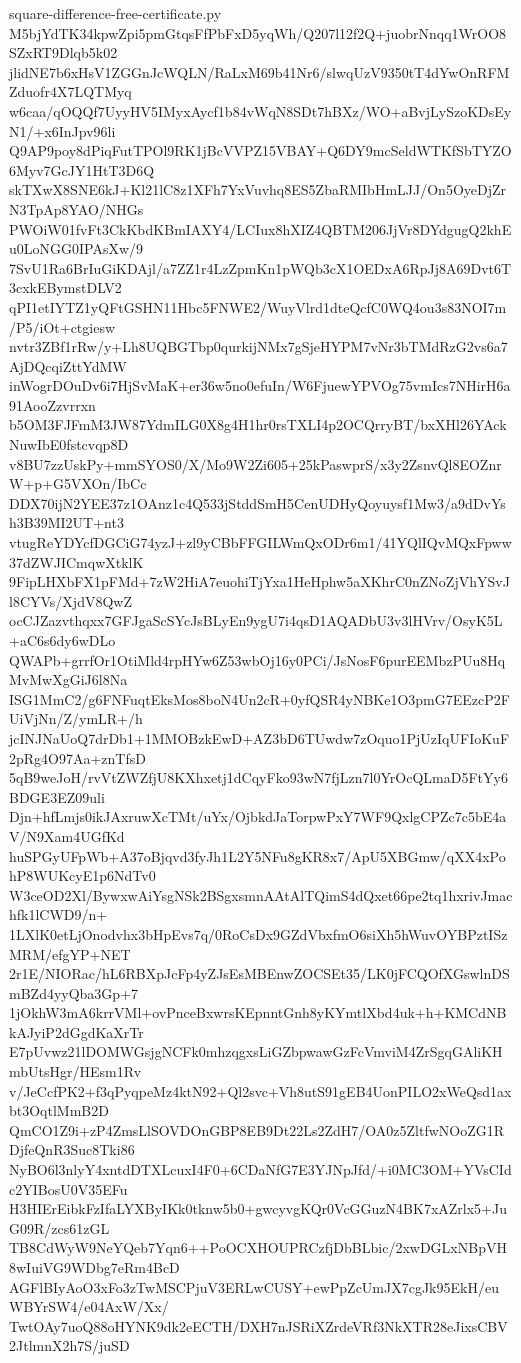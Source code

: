 \documentclass[11pt]{article}
\theoremstyle{definition}
\theoremstyle{remark}
\begin{document}
\begin{filecontents*}[overwrite]{square-difference-free-certificate.py}
M5bjYdTK34kpwZpi5pmGtqsFfPbFxD5yqWh/Q207l12f2Q+juobrNnqq1WrOO8SZxRT9Dlqb5k02
jlidNE7b6xHsV1ZGGnJcWQLN/RaLxM69b41Nr6/slwqUzV9350tT4dYwOnRFMZduofr4X7LQTMyq
w6caa/qOQQf7UyyHV5IMyxAycf1b84vWqN8SDt7hBXz/WO+aBvjLySzoKDsEyN1/+x6InJpv96li
Q9AP9poy8dPiqFutTPOl9RK1jBcVVPZ15VBAY+Q6DY9mcSeldWTKfSbTYZO6Myv7GcJY1HtT3D6Q
skTXwX8SNE6kJ+Kl21lC8z1XFh7YxVuvhq8ES5ZbaRMIbHmLJJ/On5OyeDjZrN3TpAp8YAO/NHGs
PWOiW01fvFt3CkKbdKBmIAXY4/LCIux8hXIZ4QBTM206JjVr8DYdgugQ2khEu0LoNGG0IPAsXw/9
7SvU1Ra6BrIuGiKDAjl/a7ZZ1r4LzZpmKn1pWQb3cX1OEDxA6RpJj8A69Dvt6T3cxkEBymstDLV2
qPI1etIYTZ1yQFtGSHN11Hbc5FNWE2/WuyVlrd1dteQcfC0WQ4ou3s83NOI7m/P5/iOt+ctgiesw
nvtr3ZBf1rRw/y+Lh8UQBGTbp0qurkijNMx7gSjeHYPM7vNr3bTMdRzG2vs6a7AjDQcqiZttYdMW
inWogrDOuDv6i7HjSvMaK+er36w5no0efuIn/W6FjuewYPVOg75vmIcs7NHirH6a91AooZzvrrxn
b5OM3FJFmM3JW87YdmILG0X8g4H1hr0rsTXLI4p2OCQrryBT/bxXHl26YAckNuwIbE0fstcvqp8D
v8BU7zzUskPy+mmSYOS0/X/Mo9W2Zi605+25kPaswprS/x3y2ZsnvQl8EOZnrW+p+G5VXOn/IbCc
DDX70ijN2YEE37z1OAnz1c4Q533jStddSmH5CenUDHyQoyuysf1Mw3/a9dDvYsh3B39MI2UT+nt3
vtugReYDYcfDGCiG74yzJ+zl9yCBbFFGILWmQxODr6m1/41YQlIQvMQxFpww37dZWJICmqwXtklK
9FipLHXbFX1pFMd+7zW2HiA7euohiTjYxa1HeHphw5aXKhrC0nZNoZjVhYSvJl8CYVs/XjdV8QwZ
ocCJZazvthqxx7GFJgaScSYcJsBLyEn9ygU7i4qsD1AQADbU3v3lHVrv/OsyK5L+aC6s6dy6wDLo
QWAPb+grrfOr1OtiMld4rpHYw6Z53wbOj16y0PCi/JsNosF6purEEMbzPUu8HqMvMwXgGiJ6l8Na
ISG1MmC2/g6FNFuqtEksMos8boN4Un2cR+0yfQSR4yNBKe1O3pmG7EEzcP2FUiVjNn/Z/ymLR+/h
jcINJNaUoQ7drDb1+1MMOBzkEwD+AZ3bD6TUwdw7zOquo1PjUzIqUFIoKuF2pRg4O97Aa+znTfsD
5qB9weJoH/rvVtZWZfjU8KXhxetj1dCqyFko93wN7fjLzn7l0YrOcQLmaD5FtYy6BDGE3EZ09uli
Djn+hfLmjs0ikJAxruwXcTMt/uYx/OjbkdJaTorpwPxY7WF9QxlgCPZc7c5bE4aV/N9Xam4UGfKd
huSPGyUFpWb+A37oBjqvd3fyJh1L2Y5NFu8gKR8x7/ApU5XBGmw/qXX4xPohP8WUKcyE1p6NdTv0
W3ceOD2Xl/BywxwAiYsgNSk2BSgxsmnAAtAlTQimS4dQxet66pe2tq1hxrivJmachfk1lCWD9/n+
1LXlK0etLjOnodvhx3bHpEvs7q/0RoCsDx9GZdVbxfmO6siXh5hWuvOYBPztISzMRM/efgYP+NET
2r1E/NIORac/hL6RBXpJcFp4yZJsEsMBEnwZOCSEt35/LK0jFCQOfXGswlnDSmBZd4yyQba3Gp+7
1jOkhW3mA6krrVMl+ovPnceBxwrsKEpnntGnh8yKYmtlXbd4uk+h+KMCdNBkAJyiP2dGgdKaXrTr
E7pUvwz21lDOMWGsjgNCFk0mhzqgxsLiGZbpwawGzFcVmviM4ZrSgqGAliKHmbUtsHgr/HEsm1Rv
v/JeCcfPK2+f3qPyqpeMz4ktN92+Ql2svc+Vh8utS91gEB4UonPILO2xWeQsd1axbt3OqtlMmB2D
QmCO1Z9i+zP4ZmsLlSOVDOnGBP8EB9Dt22Ls2ZdH7/OA0z5ZltfwNOoZG1RDjfeQnR3Suc8Tki86
NyBO6l3nlyY4xntdDTXLcuxI4F0+6CDaNfG7E3YJNpJfd/+i0MC3OM+YVsCIdc2YIBosU0V35EFu
H3HIErEibkFzIfaLYXByIKk0tknw5b0+gwcyvgKQr0VcGGuzN4BK7xAZrlx5+JuG09R/zcs61zGL
TB8CdWyW9NeYQeb7Yqn6++PoOCXHOUPRCzfjDbBLbic/2xwDGLxNBpVH8wIuiVG9WDbg7eRm4BcD
AGFlBIyAoO3xFo3zTwMSCPjuV3ERLwCUSY+ewPpZcUmJX7cgJk95EkH/euWBYrSW4/e04AxW/Xx/
TwtOAy7uoQ88oHYNK9dk2eECTH/DXH7nJSRiXZrdeVRf3NkXTR28eJixsCBV2JtlmnX2h7S/juSD

\end{filecontents*}
\end{document}
